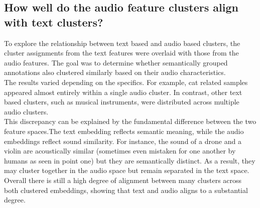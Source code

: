 \subsection{How well do the audio feature clusters align with text clusters?}
\label{sec:Text Features:c}


To explore the relationship between text based and audio based clusters, the cluster assignments from the text features were overlaid with those from the audio features. The goal was to determine whether semantically grouped annotations also clustered similarly based on their audio characteristics.\\
The results varied depending on the specifics. For example, cat related samples appeared almost entirely within a single audio cluster. In contrast, other text based clusters, such as musical instruments, were distributed across multiple audio clusters.\\
This discrepancy can be explained by the fundamental difference between the two feature spaces.The text embedding reflects semantic meaning, while the audio embeddings reflect sound similarity. For instance, the sound of a drone and a violin are acoustically similar (sometimes even mistaken for one another by humans as seen in point one) but they are semantically distinct. As a result, they may cluster together in the audio space but remain separated in the text space.\\
Overall there is still a high degree of alignment between many clusters across both clustered embeddings, showing that text and audio aligns to a substantial degree.


